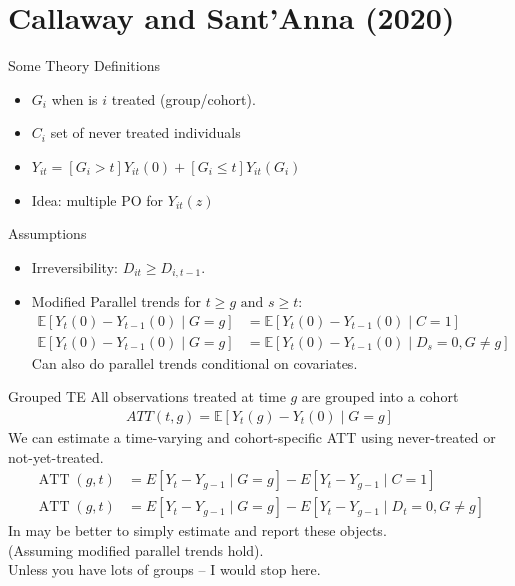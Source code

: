 \documentclass[xcolor=pdftex,dvipsnames,table,mathserif,aspectratio=169]{beamer}
\begin{document}
\section*{Callaway and Sant'Anna (2020)}
\begin{frame}{Some Theory}
Definitions
\begin{itemize}
\item $G_i$ when is $i$ treated (group/cohort).
\item $C_i$ set of never treated individuals
\item $Y_{it} = [G_i > t] Y_{it}(0) + [G_i \leq t] Y_{it}(G_i) $
\item Idea: multiple PO for $Y_{it}(z)$
\end{itemize}

Assumptions
\begin{itemize}
\item Irreversibility: $D_{it} \geq D_{i,t-1}$.
\item Modified Parallel trends for $t \geq g \text { and } s \geq t$:
\begin{align*}
\mathbb{E}\left[Y_{t}(0)-Y_{t-1}(0) \mid G=g\right]&=\mathbb{E}\left[Y_{t}(0)-Y_{t-1}(0) \mid C=1\right] \\
\mathbb{E}\left[Y_{t}(0)-Y_{t-1}(0) \mid G=g\right]&=\mathbb{E}\left[Y_{t}(0)-Y_{t-1}(0) \mid D_{s}=0, G \neq g\right]
\end{align*}
Can also do parallel trends \alert{conditional on covariates}.
\end{itemize}
\end{frame}

\begin{frame}{Grouped TE}
\small
All observations treated at time $g$ are grouped into a \alert{cohort}
\begin{align*}
ATT(t,g) = \mathbb{E}\left[Y_{t}(g)-Y_{t}(0) \mid G=g\right]
\end{align*}
We can estimate a \alert{time-varying} and \alert{cohort-specific} ATT using \alert{never-treated} or \alert{not-yet-treated}.
\begin{align*}
\operatorname{ATT}(g, t)&=E\left[Y_{t}-Y_{g-1} \mid G=g\right]-E\left[Y_{t}-Y_{g-1} \mid C=1\right] \\
\operatorname{ATT}(g, t)&=E\left[Y_{t}-Y_{g-1} \mid G=g\right]-E\left[Y_{t}-Y_{g-1} \mid D_{t}=0, G \neq g\right]
\end{align*}
In may be better to simply estimate and report these objects.\\
 (Assuming modified parallel trends hold).\\
 Unless you have lots of groups -- I would stop here.
\end{frame}
\end{document}
